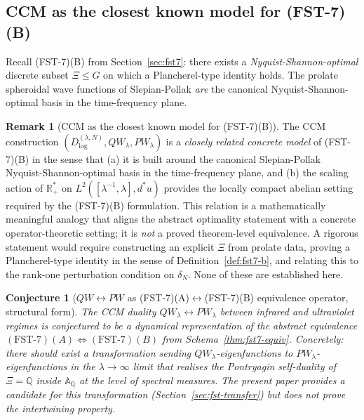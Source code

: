 \documentclass[11pt,a4paper]{article}
\theoremstyle{plain}
\newtheorem{conjecture}[theorem]{Conjecture}
\theoremstyle{definition}
\newtheorem{remark}[theorem]{Remark}
\newcommand{\R}{\mathbb{R}}
\newcommand{\Q}{\mathbb{Q}}
\newcommand{\A}{\mathbb{A}}
\begin{document}
\subsection{CCM as the closest known model for (FST-7)(B)}
\label{sec:ccm-as-fst7b}

Recall (FST-7)(B) from Section~\ref{sec:fst7}: there exists a
\emph{Nyquist-Shannon-optimal} discrete subset $\Xi \le G$ on which
a Plancherel-type identity holds.  The prolate spheroidal wave
functions of Slepian-Pollak \emph{are} the canonical
Nyquist-Shannon-optimal basis in the time-frequency plane.

\begin{remark}[CCM as the closest known model for
(FST-7)(B)]\label{rem:ccm-closest-model}
The CCM construction $(D^{(\lambda,N)}_{\log}, QW_\lambda,
PW_\lambda)$ is a \emph{closely related concrete model} of
(FST-7)(B) in the sense that (a) it is built around the canonical
Slepian-Pollak Nyquist-Shannon-optimal basis in the time-frequency
plane, and (b) the scaling action of $\R_+^\ast$ on
$L^2([\lambda^{-1},\lambda], d^\ast u)$ provides the locally compact
abelian setting required by the (FST-7)(B) formulation.  This
relation is a mathematically meaningful analogy that aligns the
abstract optimality statement with a concrete operator-theoretic
setting; it is \emph{not} a proved theorem-level equivalence.  A
rigorous statement would require constructing an explicit $\Xi$
from prolate data, proving a Plancherel-type identity in the sense
of Definition~\ref{def:fst7-b}, and relating this to the rank-one
perturbation condition on $\delta_N$.  None of these are
established here.
\end{remark}

\begin{conjecture}[$QW\!\leftrightarrow\! PW$ as
(FST-7)(A)$\leftrightarrow$(FST-7)(B) equivalence operator,
structural form]\label{conj:qw-pw-fst7}
The CCM duality $QW_\lambda \leftrightarrow PW_\lambda$ between
infrared and ultraviolet regimes is conjectured to be a dynamical
representation of the abstract equivalence $(\text{FST-7})(A)
\Leftrightarrow (\text{FST-7})(B)$ from
Schema~\ref{thm:fst7-equiv}.  Concretely: there should exist a
transformation sending $QW_\lambda$-eigenfunctions to
$PW_\lambda$-eigenfunctions in the $\lambda \to \infty$ limit that
realises the Pontryagin self-duality of $\Xi = \Q$ inside $\A_\Q$ at
the level of spectral measures.  The present paper provides a
candidate for this transformation (Section~\ref{sec:fst-transfer})
but does not prove the intertwining property.
\end{conjecture}
\end{document}
